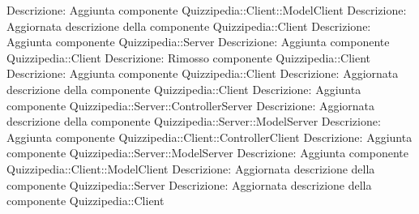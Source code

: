 Descrizione: Aggiunta componente Quizzipedia::Client::ModelClient 
Descrizione: Aggiornata descrizione della componente Quizzipedia::Client 
Descrizione: Aggiunta componente Quizzipedia::Server 
Descrizione: Aggiunta componente Quizzipedia::Client 
Descrizione: Rimosso componente Quizzipedia::Client 
Descrizione: Aggiunta componente Quizzipedia::Client 
Descrizione: Aggiornata descrizione della componente Quizzipedia::Client 
Descrizione: Aggiunta componente Quizzipedia::Server::ControllerServer 
Descrizione: Aggiornata descrizione della componente Quizzipedia::Server::ModelServer 
Descrizione: Aggiunta componente Quizzipedia::Client::ControllerClient 
Descrizione: Aggiunta componente Quizzipedia::Server::ModelServer 
Descrizione: Aggiunta componente Quizzipedia::Client::ModelClient 
Descrizione: Aggiornata descrizione della componente Quizzipedia::Server 
Descrizione: Aggiornata descrizione della componente Quizzipedia::Client 
